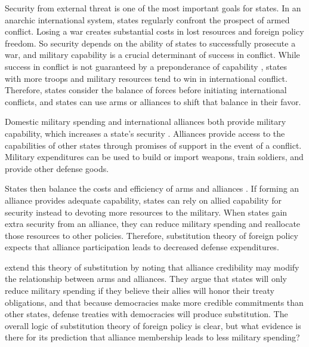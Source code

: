 \documentclass[12pt]{article}
\begin{document}
Security from external threat is one of the most important goals for states. 
In an anarchic international system, states regularly confront the prospect of armed conflict. 
Losing a war creates substantial costs in lost resources and foreign policy freedom.
So security depends on the ability of states to successfully prosecute a war, and military capability is a crucial determinant of success in conflict. 
While success in conflict is not guaranteed by a preponderance of capability \citep{Arreguin-Toft2005, Sullivan2012}, states with more troops and military resources tend to win in international conflict. 
Therefore, states consider the balance of forces before initiating international conflicts, and states can use arms or alliances to shift that balance in their favor. 


Domestic military spending and international alliances both provide military capability, which increases a state's security \citep{Morrow1993}. 
Alliances provide access to the capabilities of other states through promises of support in the event of a conflict. 
Military expenditures can be used to build or import weapons, train soldiers, and provide other defense goods. 


States then balance the costs and efficiency of arms and alliances \citep{Morrow1993, Conybeare1994}. 
If forming an alliance provides adequate capability, states can rely on allied capability for security instead to devoting more resources to the military. 
When states gain extra security from an alliance, they can reduce military spending and reallocate those resources to other policies. 
Therefore, substitution theory of foreign policy expects that alliance participation leads to decreased defense expenditures.


\citet{DigiuseppePoast2016} extend this theory of substitution by noting that alliance credibility may modify the relationship between arms and alliances. 
They argue that states will only reduce military spending if they believe their allies will honor their treaty obligations, and that because democracies make more credible commitments than other states, defense treaties with democracies will produce substitution. 
The overall logic of substitution theory of foreign policy is clear, but what evidence is there for its prediction that alliance membership leads to less military spending? 
\end{document}
